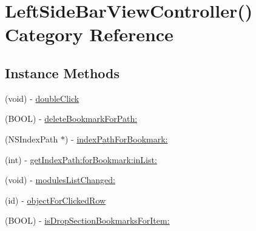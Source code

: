 \hypertarget{category_left_side_bar_view_controller_07_08}{\section{Left\-Side\-Bar\-View\-Controller() Category Reference}
\label{category_left_side_bar_view_controller_07_08}
}
\subsection*{Instance Methods}
\begin{DoxyCompactItemize}
\item 
(void) -\/ \hyperlink{category_left_side_bar_view_controller_07_08_a029af899a4779fe3577bcdbb68c2946c}{double\-Click}
\item 
(B\-O\-O\-L) -\/ \hyperlink{category_left_side_bar_view_controller_07_08_a838a91005eb8985fbf85795db174dff1}{delete\-Bookmark\-For\-Path\-:}
\item 
(N\-S\-Index\-Path $\ast$) -\/ \hyperlink{category_left_side_bar_view_controller_07_08_a979894a41d5faf7514eb24f3f508c432}{index\-Path\-For\-Bookmark\-:}
\item 
(int) -\/ \hyperlink{category_left_side_bar_view_controller_07_08_a2b37ff06338bb334d7272a901ca2dca5}{get\-Index\-Path\-:for\-Bookmark\-:in\-List\-:}
\item 
(void) -\/ \hyperlink{category_left_side_bar_view_controller_07_08_a4492cb3261c570eb4f08e2cd006a4d69}{modules\-List\-Changed\-:}
\item 
(id) -\/ \hyperlink{category_left_side_bar_view_controller_07_08_a0942a28e84257218564aa8182752e6e7}{object\-For\-Clicked\-Row}
\item 
(B\-O\-O\-L) -\/ \hyperlink{category_left_side_bar_view_controller_07_08_a02bdcca0d887ddbc7af1703578420c9d}{is\-Drop\-Section\-Bookmarks\-For\-Item\-:}
\end{DoxyCompactItemize}


